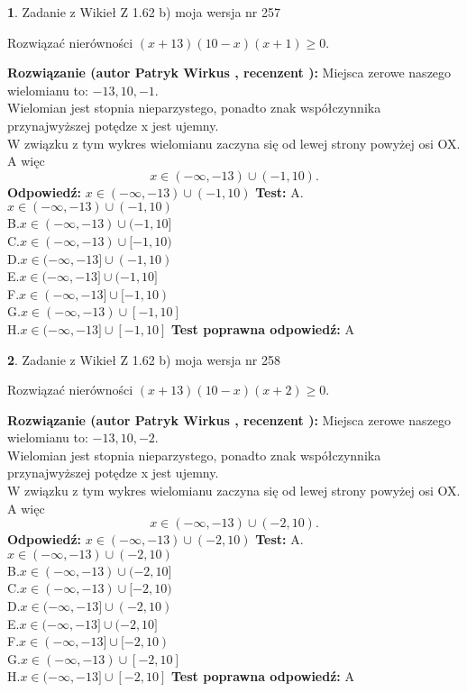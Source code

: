 \documentclass[12pt, a4paper]{article}
\theoremstyle{definition} %
\newtheorem{zad}{}
\newcommand{\zadStart}[1]{\begin{zad}#1\newline}
\newcommand{\zadStop}{\end{zad}}
\newcommand{\rozwStart}[2]{\noindent \textbf{Rozwiązanie (autor #1 , recenzent #2): }\newline}
\newcommand{\rozwStop}{\newline}
\newcommand{\odpStart}{\noindent \textbf{Odpowiedź:}\newline}
\newcommand{\odpStop}{\newline}
\newcommand{\testStart}{\noindent \textbf{Test:}\newline}
\newcommand{\testStop}{\newline}
\newcommand{\kluczStart}{\noindent \textbf{Test poprawna odpowiedź:}\newline}
\newcommand{\kluczStop}{\newline}
\begin{document}
\zadStart{Zadanie z Wikieł Z 1.62 b) moja wersja nr 257}

Rozwiązać nierówności $(x+13)(10-x)(x+1)\ge0$.
\zadStop
\rozwStart{Patryk Wirkus}{}
Miejsca zerowe naszego wielomianu to: $-13, 10, -1$.\\
Wielomian jest stopnia nieparzystego, ponadto znak współczynnika przy\linebreak najwyższej potędze x jest ujemny.\\ W związku z tym wykres wielomianu zaczyna się od lewej strony powyżej osi OX. A więc $$x \in (-\infty,-13) \cup (-1,10).$$
\rozwStop
\odpStart
$x \in (-\infty,-13) \cup (-1,10)$
\odpStop
\testStart
A.$x \in (-\infty,-13) \cup (-1,10)$\\
B.$x \in (-\infty,-13) \cup (-1,10]$\\
C.$x \in (-\infty,-13) \cup [-1,10)$\\
D.$x \in (-\infty,-13] \cup (-1,10)$\\
E.$x \in (-\infty,-13] \cup (-1,10]$\\
F.$x \in (-\infty,-13] \cup [-1,10)$\\
G.$x \in (-\infty,-13) \cup [-1,10]$\\
H.$x \in (-\infty,-13] \cup [-1,10]$
\testStop
\kluczStart
A
\kluczStop



\zadStart{Zadanie z Wikieł Z 1.62 b) moja wersja nr 258}

Rozwiązać nierówności $(x+13)(10-x)(x+2)\ge0$.
\zadStop
\rozwStart{Patryk Wirkus}{}
Miejsca zerowe naszego wielomianu to: $-13, 10, -2$.\\
Wielomian jest stopnia nieparzystego, ponadto znak współczynnika przy\linebreak najwyższej potędze x jest ujemny.\\ W związku z tym wykres wielomianu zaczyna się od lewej strony powyżej osi OX. A więc $$x \in (-\infty,-13) \cup (-2,10).$$
\rozwStop
\odpStart
$x \in (-\infty,-13) \cup (-2,10)$
\odpStop
\testStart
A.$x \in (-\infty,-13) \cup (-2,10)$\\
B.$x \in (-\infty,-13) \cup (-2,10]$\\
C.$x \in (-\infty,-13) \cup [-2,10)$\\
D.$x \in (-\infty,-13] \cup (-2,10)$\\
E.$x \in (-\infty,-13] \cup (-2,10]$\\
F.$x \in (-\infty,-13] \cup [-2,10)$\\
G.$x \in (-\infty,-13) \cup [-2,10]$\\
H.$x \in (-\infty,-13] \cup [-2,10]$
\testStop
\kluczStart
A
\kluczStop
\end{document}
